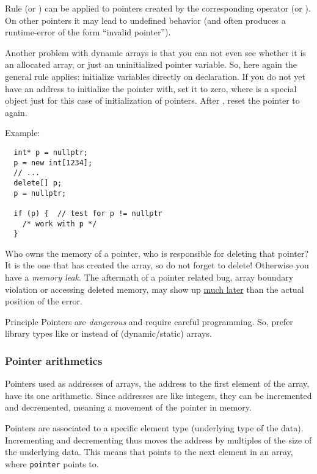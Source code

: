 \begin{guideline}{Rule}
   (or ) can be applied to pointers created by the corresponding operator  (or ). On other pointers
  it may lead to undefined behavior (and often produces a runtime-error of the form ``invalid pointer'').
\end{guideline}

Another problem with dynamic arrays is that you can not even see whether it is an allocated array, or just an uninitialized pointer variable. So,
here again the general rule applies: initialize variables directly on declaration. If you do not yet have an address to initialize the pointer with,
set it to zero, \ie
%
%
where  is a special object just for this case of initialization of pointers. After , reset the pointer to  again.

Example:
\begin{verbatim}
  int* p = nullptr;
  p = new int[1234];
  // ...
  delete[] p;
  p = nullptr;

  if (p) {  // test for p != nullptr
    /* work with p */
  }
\end{verbatim}

Who owns the memory of a pointer, \ie who is responsible for deleting that pointer? It is the one that has created the array, so do not forget to delete!
Otherwise you have a \emph{memory leak}. The aftermath of a pointer related bug, \eg array boundary violation or accessing deleted memory, may show up \underline{much later} than the actual position of the error.

\begin{guideline}{Principle}
  Pointers are \emph{dangerous} and require careful programming. So, prefer library types like  or  instead of
  (dynamic/static) arrays.
\end{guideline}


\subsubsection{Pointer arithmetics}
Pointers used as addresses of arrays, \ie the address to the first element of the array, have its one arithmetic. Since addresses are like integers,
they can be incremented and decremented, meaning a movement of the pointer in memory.

Pointers are associated to a specific element type (underlying type of the data). Incrementing and decrementing thus moves the address by multiples of
the size of the underlying data. This means that  points to the next element in an array, where \texttt{pointer} points to.

